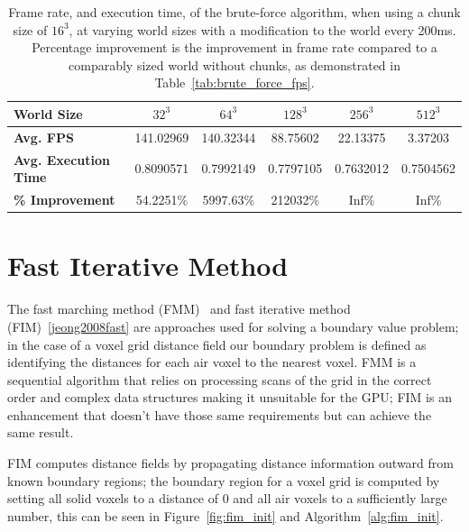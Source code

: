 \begin{table}[h!]
    \centering
    \vspace{0.5em}
    \begin{tabular}{l|*{5}{c}}
        \toprule
        \textbf{World Size}          & \textbf{\(32^3\)} & \textbf{\(64^3\)} & \textbf{\(128^3\)} & \textbf{\(256^3\)} & \textbf{\(512^3\)} \\
        \midrule
        \textbf{Avg. FPS}            & 141.02969         & 140.32344         & 88.75602           & 22.13375           & 3.37203            \\
        \textbf{Avg. Execution Time} & 0.8090571         & 0.7992149         & 0.7797105          & 0.7632012          & 0.7504562          \\
        \textbf{\% Improvement}      & 54.2251\%         & 5997.63\%         & 212032\%           & Inf\%              & Inf\%              \\
        \bottomrule
    \end{tabular}
    \caption{Frame rate, and execution time, of the brute-force algorithm, when using a chunk size of \(16^3\), at
        varying world sizes with a modification to the world every 200ms. Percentage improvement is the improvement in
        frame rate compared to a comparably sized world without chunks, as demonstrated in Table~\ref{tab:brute_force_fps}.}
    \label{tab:chunks_perf}
\end{table}

\FloatBarrier

\section{Fast Iterative Method} \label{sec:fim}
The fast marching method (FMM)~\cite{sethian1999fast} and fast iterative method (FIM)~\ref{jeong2008fast} are
approaches used for solving a boundary value problem; in the case of a voxel grid distance field our boundary problem is
defined as identifying the distances for each air voxel to the nearest voxel. FMM is a sequential algorithm that relies
on processing scans of the grid in the correct order and complex data structures making it unsuitable for the GPU; FIM
is an enhancement that doesn't have those same requirements but can achieve the same result.

FIM computes distance fields by propagating distance information outward from known boundary regions; the boundary
region for a voxel grid is computed by setting all solid voxels to a distance of 0 and all air voxels to a sufficiently
large number, this can be seen in Figure~\ref{fig:fim_init} and Algorithm~\ref{alg:fim_init}.

